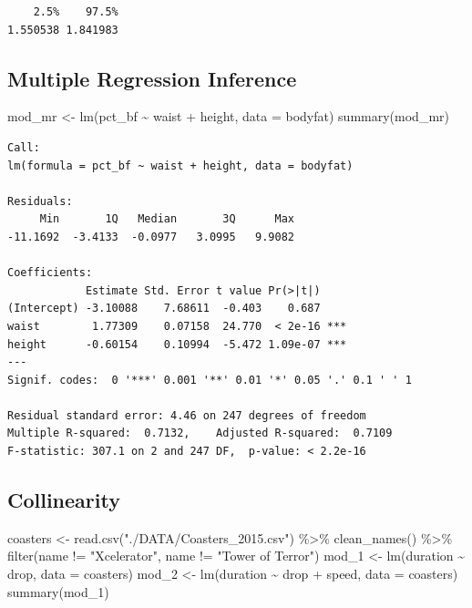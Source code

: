 \documentclass[
]{article}
\newenvironment{Shaded}{\begin{snugshade}}{\end{snugshade}}
\newcommand{\AttributeTok}[1]{\textcolor[rgb]{0.77,0.63,0.00}{#1}}
\newcommand{\FunctionTok}[1]{\textcolor[rgb]{0.00,0.00,0.00}{#1}}
\newcommand{\NormalTok}[1]{#1}
\newcommand{\OtherTok}[1]{\textcolor[rgb]{0.56,0.35,0.01}{#1}}
\newcommand{\SpecialCharTok}[1]{\textcolor[rgb]{0.00,0.00,0.00}{#1}}
\newcommand{\StringTok}[1]{\textcolor[rgb]{0.31,0.60,0.02}{#1}}
\begin{document}
\begin{verbatim}
    2.5%    97.5% 
1.550538 1.841983 
\end{verbatim}

\hypertarget{multiple-regression-inference}{%
\subsection{Multiple Regression Inference}\label{multiple-regression-inference}}

\begin{Shaded}
\begin{Highlighting}[]
\NormalTok{mod\_mr }\OtherTok{\textless{}{-}} \FunctionTok{lm}\NormalTok{(pct\_bf }\SpecialCharTok{\textasciitilde{}}\NormalTok{ waist }\SpecialCharTok{+}\NormalTok{ height, }\AttributeTok{data =}\NormalTok{ bodyfat)}
\FunctionTok{summary}\NormalTok{(mod\_mr)}
\end{Highlighting}
\end{Shaded}

\begin{verbatim}
Call:
lm(formula = pct_bf ~ waist + height, data = bodyfat)

Residuals:
     Min       1Q   Median       3Q      Max 
-11.1692  -3.4133  -0.0977   3.0995   9.9082 

Coefficients:
            Estimate Std. Error t value Pr(>|t|)    
(Intercept) -3.10088    7.68611  -0.403    0.687    
waist        1.77309    0.07158  24.770  < 2e-16 ***
height      -0.60154    0.10994  -5.472 1.09e-07 ***
---
Signif. codes:  0 '***' 0.001 '**' 0.01 '*' 0.05 '.' 0.1 ' ' 1

Residual standard error: 4.46 on 247 degrees of freedom
Multiple R-squared:  0.7132,    Adjusted R-squared:  0.7109 
F-statistic: 307.1 on 2 and 247 DF,  p-value: < 2.2e-16
\end{verbatim}

\hypertarget{collinearity}{%
\subsection{Collinearity}\label{collinearity}}

\begin{Shaded}
\begin{Highlighting}[]
\NormalTok{coasters }\OtherTok{\textless{}{-}} \FunctionTok{read.csv}\NormalTok{(}\StringTok{"./DATA/Coasters\_2015.csv"}\NormalTok{) }\SpecialCharTok{\%\textgreater{}\%} 
  \FunctionTok{clean\_names}\NormalTok{() }\SpecialCharTok{\%\textgreater{}\%} 
\FunctionTok{filter}\NormalTok{(name }\SpecialCharTok{!=} \StringTok{"Xcelerator"}\NormalTok{, name }\SpecialCharTok{!=} \StringTok{"Tower of Terror"}\NormalTok{)}
\NormalTok{mod\_1 }\OtherTok{\textless{}{-}} \FunctionTok{lm}\NormalTok{(duration }\SpecialCharTok{\textasciitilde{}}\NormalTok{ drop, }\AttributeTok{data =}\NormalTok{ coasters)}
\NormalTok{mod\_2 }\OtherTok{\textless{}{-}} \FunctionTok{lm}\NormalTok{(duration }\SpecialCharTok{\textasciitilde{}}\NormalTok{ drop }\SpecialCharTok{+}\NormalTok{ speed, }\AttributeTok{data =}\NormalTok{ coasters)}
\FunctionTok{summary}\NormalTok{(mod\_1)}
\end{Highlighting}
\end{Shaded}
\end{document}
